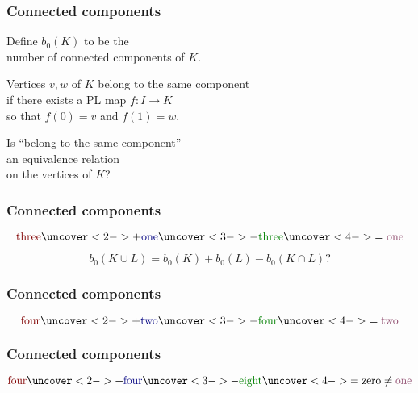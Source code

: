 \documentclass[14pt]{beamer}
\begin{document}
\begin{frame}
\frametitle{Connected components}

Define $b_0(K)$ to be the \\
number of connected components of $K$.

\vfill
\pause
Vertices $v, w$ of $K$ belong to the same component \\
if there exists a PL map $f : I \to K$ \\
so that $f(0) = v$ and $f(1) = w$.

\vfill
\pause

\begin{problem}
Is ``belong to the same component'' \\
an equivalence relation \\
on the vertices of $K$?
\end{problem}

\end{frame}

\begin{frame}
\frametitle{Connected components}
%
%
%
%
$$
\mbox{\textcolor{red!50!black}{three}}
\uncover<2->{+ \mbox{\textcolor{blue!50!black}{one}}}
\uncover<3->{- \mbox{\textcolor{green!50!black}{three}}}
\uncover<4->{= \mbox{\textcolor{magenta!50!black}{one}}}
$$
\end{frame}

\begin{frame}
\vfill
$$
b_0(K \cup L) = b_0(K) + b_0(L) - b_0(K \cap L)?
$$
\vfill
\end{frame}

\begin{frame}
\frametitle{Connected components}
%
%
%
%
$$
\mbox{\textcolor{red!50!black}{four}}
\uncover<2->{+ \mbox{\textcolor{blue!50!black}{two}}}
\uncover<3->{- \mbox{\textcolor{green!50!black}{four}}}
\uncover<4->{= \mbox{\textcolor{magenta!50!black}{two}}}
$$
\end{frame}

\begin{frame}
\frametitle{Connected components}
%
%
%
%
$$
\mbox{\textcolor{red!50!black}{four}}
\uncover<2->{+ \mbox{\textcolor{blue!50!black}{four}}}
\uncover<3->{- \mbox{\textcolor{green!50!black}{eight}}}
\uncover<4->{= \mbox{zero} \neq \mbox{\textcolor{magenta!50!black}{one}}}
$$
\end{frame}
\end{document}
